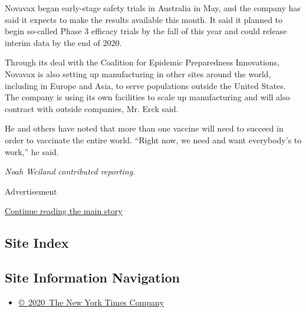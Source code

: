 Novavax began early-stage safety trials in Australia in May, and the
company has said it expects to make the results available this month. It
said it planned to begin so-called Phase 3 efficacy trials by the fall
of this year and could release interim data by the end of 2020.

Through its deal with the Coalition for Epidemic Preparedness
Innovations, Novavax is also setting up manufacturing in other sites
around the world, including in Europe and Asia, to serve populations
outside the United States. The company is using its own facilities to
scale up manufacturing and will also contract with outside companies,
Mr. Erck said.

He and others have noted that more than one vaccine will need to succeed
in order to vaccinate the entire world. ``Right now, we need and want
everybody's to work,'' he said.

\emph{Noah Weiland contributed reporting.}

Advertisement

\protect\hyperlink{after-bottom}{Continue reading the main story}

\hypertarget{site-index}{%
\subsection{Site Index}\label{site-index}}

\hypertarget{site-information-navigation}{%
\subsection{Site Information
Navigation}\label{site-information-navigation}}

\begin{itemize}
\tightlist
\item
  \href{https://help.nytimes3xbfgragh.onion/hc/en-us/articles/115014792127-Copyright-notice}{©~2020~The
  New York Times Company}
\end{itemize}

